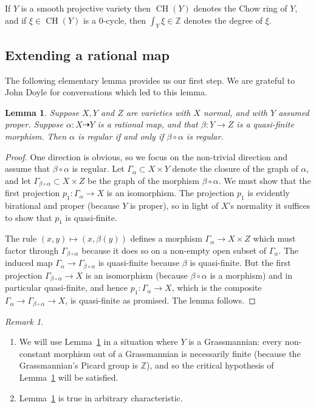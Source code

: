 \documentclass[12pt]{article}
\theoremstyle{plain}
\newtheorem{lemma}[theorem]{Lemma}
\theoremstyle{remark}
\newtheorem{remark}[theorem]{Remark}
\newcommand{\CH}{\operatorname{CH}}
\newcommand{\Z}{\mathbb{Z}}
\begin{document}
    If $Y$ is a smooth projective variety then $\CH(Y)$ denotes the Chow ring of $Y$, and if $\xi \in \CH(Y)$ is a $0$-cycle, then $\int_{Y} \xi \in \Z$ denotes the degree of $\xi$.

    \subsection{Extending a rational map}

    The following elementary lemma provides us our first step.  We are grateful to John Doyle for conversations which led to this lemma.

    \begin{lemma}
        \label{lemma:extension}
        Suppose $X, Y$ and $Z$ are varieties with $X$ normal, and with $Y$ assumed proper. Suppose $\alpha : X \dashrightarrow Y$ is a rational map, and that $\beta : Y \to Z$ is a quasi-finite morphism.  Then $\alpha$ is regular if and only if $\beta \circ \alpha$ is regular.
    \end{lemma}

    \begin{proof}
        \label{proof:extension}
        One direction is obvious, so we focus on the non-trivial direction and assume that $\beta \circ \alpha$ is regular. Let $\Gamma_{\alpha} \subset X \times Y$ denote the closure of the graph of $\alpha$, and let $\Gamma_{\beta \circ \alpha} \subset X \times Z$ be the graph of the morphism $\beta \circ \alpha$.  We must show that the first projection $p_1 : \Gamma_{\alpha} \to X$ is an isomorphism.  The projection $p_1$ is evidently birational and proper (because $Y$ is proper), so in light of $X$'s normality it suffices to show that $p_1$ is quasi-finite.

        The rule $(x,y) \mapsto (x,\beta(y))$ defines a morphism $\Gamma_{\alpha} \to X \times Z$ which must factor through $\Gamma_{\beta \circ \alpha}$ because it does so on a non-empty open subset of $\Gamma_{\alpha}$.  The induced map $\Gamma_{\alpha} \to \Gamma_{\beta \circ \alpha}$ is quasi-finite because $\beta$ is quasi-finite.   But the  first projection $\Gamma_{\beta \circ \alpha} \to X$ is an isomorphism (because $\beta \circ \alpha$ is a morphism) and in particular quasi-finite, and hence $p_1 : \Gamma_{\alpha} \to X$, which is the composite $\Gamma_{\alpha} \to \Gamma_{\beta \circ \alpha} \to X$, is quasi-finite as promised. The lemma follows.
    \end{proof}

    \begin{remark}
        \label{remark:grassmannian}
        \begin{enumerate}
            \item We will use Lemma~\ref{lemma:extension} in a situation where $Y$ is a Grassmannian: every non-constant morphism out of a Grassmannian is necessarily finite (because the Grassmannian's Picard group is $\Z$), and so the critical hypothesis of Lemma~\ref{lemma:extension} will be satisfied.
            \item Lemma~\ref{lemma:extension} is true in arbitrary characteristic.
        \end{enumerate}
    \end{remark}
\end{document}
